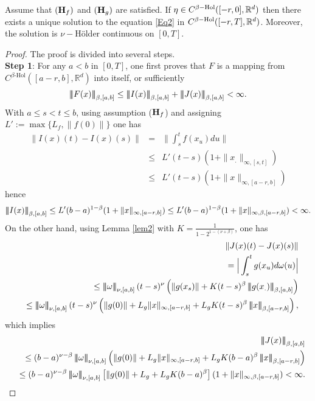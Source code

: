 \documentclass[graybox]{svmult}
\newcommand{\R}{\ensuremath{\mathbb{R}}}
\newcommand{\ltn}{\ensuremath{\left| \! \left| \! \left|}}
\newcommand{\rtn}{\ensuremath{\right| \! \right| \! \right|}}
\begin{document}
\begin{theorem}\label{thm1}
	Assume that $({\textbf H}_f)$ and $({\textbf H}_g)$ are satisfied. If $\eta \in C^{\beta\rm{-Hol}}([-r,0],\R^d)$ then there exists a unique solution to the equation \eqref{Eq2} in $C^{\beta\rm{-Hol}}([-r,T],\R^d)$. Moreover, the solution is $\nu-$H\"older continuous on $[0,T]$.
\end{theorem}
\begin{proof}
	The proof is divided into several steps.\\
	
	{\bf {Step 1}}: For any $a<b$ in $[0,T]$, one first proves that $F$ is a mapping from $C^{\beta\text{-Hol}}([a-r,b],\R^d)$ into itself, or sufficiently 
	\[
	\ltn F(x)\rtn_{\beta,[a,b]}\leq \ltn I(x)\rtn_{\beta,[a,b]}+ \ltn J(x)\rtn_{\beta,[a,b]} <\infty. 
	\]
	With $a\leq s<t\leq b$, using assumption ($\text{\bf H}_f$) and assigning $L':=\max\{L_f,\|f(0)\|\}$ one has
	\begin{eqnarray*}
		\|I(x)(t)-I(x)(s)\|&=&\Big\|\int_s^tf(x_u)du\Big\|\\
		&\leq & L' (t-s)(1+\|x_.\|_{\infty,[s,t]})\\
		&\leq & L' (t-s)(1+\|x\|_{\infty,[a-r,b]})
	\end{eqnarray*}
	hence 
	\[
	\ltn I(x)\rtn_{\beta,[a,b]}\leq L' (b-a)^{1-\beta} (1+\|x\|_{\infty,[a-r,b]})\leq L' (b-a)^{1-\beta}(1+\|x\|_{\infty,\beta,[a-r,b]}) <\infty.
	\]
	On the other hand, using Lemma \ref{lem2}  with $K=\frac{1}{1-2^{1-(\nu+\beta)}}$, one has
	\begin{eqnarray*}
	&&	\|J(x)(t)-J(x)(s)\|\\
	&&=\Big|\int_s^tg(x_u)d\omega(u)\Big|\\
	&&\leq  \ltn \omega\rtn_{\nu,[a,b]}(t-s)^\nu\left(\|g(x_s)\| + K(t-s)^\beta\ltn g(x_.)\rtn_{\beta,[a,b]}\right)\\
	&&\leq \ltn \omega\rtn_{\nu,[a,b]}(t-s)^\nu\left(\|g(0)\|+ L_g\|x\|_{\infty,[a-r,b]} + L_gK(t-s)^\beta\ltn x\rtn_{\beta,[a-r,b]}\right),
	\end{eqnarray*}
	which implies 
	\begin{eqnarray}
	&&\ltn J(x)\rtn_{\beta,[a,b]}\notag\\
	&&\leq (b-a)^{\nu-\beta} \ltn \omega\rtn_{\nu,[a,b]}\left(\|g(0)\|+ L_g\|x\|_{\infty,[a-r,b]} + L_gK(b-a)^\beta\ltn x\rtn_{\beta,[a-r,b]}\right)\notag\\
	&&\leq (b-a)^{\nu-\beta} \ltn \omega\rtn_{\nu,[a,b]}\left[\|g(0)\|+ L_g+L_g  K(b-a)^\beta\right](1+\| x\|_{\infty,\beta,[a-r,b]})<\infty.\notag

\end{eqnarray}
\end{proof}
\end{document}
